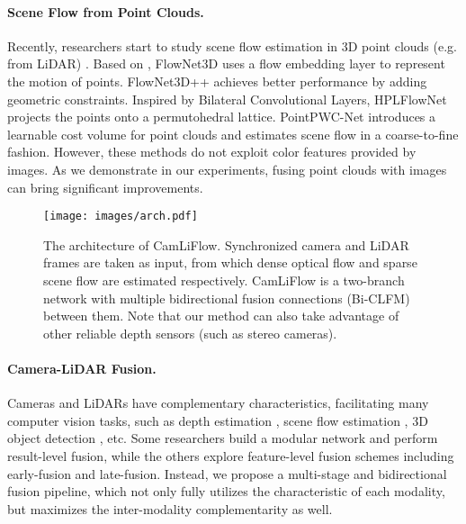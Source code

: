 \documentclass[10pt,twocolumn,letterpaper]{article}
\begin{document}
\vspace{-10pt}
\paragraph{Scene Flow from Point Clouds.} Recently, researchers start to study scene flow estimation in 3D point clouds (e.g. from LiDAR) \cite{liu2019flownet3d, wang2020flownet3d++, gu2019hplflownet, wu2019pointpwc, puy2020flot, liu2019meteornet, wei2021pvraft, kittenplon2021flowstep3d}. Based on \cite{qi2017pointnet++}, FlowNet3D \cite{liu2019flownet3d} uses a flow embedding layer to represent the motion of points. FlowNet3D++ \cite{wang2020flownet3d++} achieves better performance by adding geometric constraints. Inspired by Bilateral Convolutional Layers, HPLFlowNet \cite{gu2019hplflownet} projects the points onto a permutohedral lattice. PointPWC-Net \cite{wu2019pointpwc} introduces a learnable cost volume for point clouds and estimates scene flow in a coarse-to-fine fashion. However, these methods do not exploit color features provided by images. As we demonstrate in our experiments, fusing point clouds with images can bring significant improvements.

\begin{figure*} 
    \centering
    \texttt{[image: images/arch.pdf]}
    \vspace{-15pt}
    \caption{The architecture of CamLiFlow. Synchronized camera and LiDAR frames are taken as input, from which dense optical flow and sparse scene flow are estimated respectively. CamLiFlow is a two-branch network with multiple bidirectional fusion connections (Bi-CLFM) between them. Note that our method can also take advantage of other reliable depth sensors (such as stereo cameras).}
    \vspace{-10pt}
    \label{fig:arch}
\end{figure*}

\vspace{-10pt}
\paragraph{Camera-LiDAR Fusion.} Cameras and LiDARs have complementary characteristics, facilitating many computer vision tasks, such as depth estimation \cite{ma2018sparse, you2019pseudo,feng2021advancing}, scene flow estimation \cite{battrawy2019lidarflow, rishav2020deeplidarflow}, 3D object detection \cite{qi2018frustum, liang2018continuous, xu2018pointfusion, vora2020pointpainting, chen2017multi}, etc. Some researchers \cite{you2019pseudo, battrawy2019lidarflow, qi2018frustum, vora2020pointpainting} build a modular network and perform result-level fusion, while the others \cite{ma2018sparse, feng2021advancing, rishav2020deeplidarflow, liang2018continuous, xu2018pointfusion} explore feature-level fusion schemes including early-fusion and late-fusion. Instead, we propose a multi-stage and bidirectional fusion pipeline, which not only fully utilizes the characteristic of each modality, but maximizes the inter-modality complementarity as well.
\end{document}
